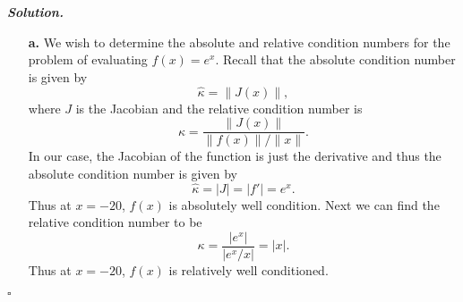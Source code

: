 \documentclass[12pt]{report}
\newenvironment{solution}[1][\it{Solution}]{\textbf{#1. } }{$\square$}
\begin{document}
\begin{solution}
    \noindent
    \begin{enumerate}
        \item [{\bf a.}]
        We wish to determine the absolute and relative condition numbers for the problem of evaluating $f(x) = e^x$. Recall that the absolute condition number is given by
        \[
            \hat{\kappa} = \|J(x)\|,
        \] 
        where $J$ is the Jacobian and the relative condition number is
        \[
            \kappa = \frac{\|J(x)\|}{\|f(x)\|/\|x\|}.
        \] 
        In our case, the Jacobian of the function is just the derivative and thus the absolute condition number is given by
        \[ \hat{\kappa} = |J| = |f'| = e^x.\]
        Thus at $x=-20$, $f(x)$ is absolutely well condition. Next we can find the relative condition number to be 
        \[ 
            \kappa = \frac{|e^x|}{|e^x/x|} = |x|.
        \]
        Thus at $x = -20$, $f(x)$ is relatively well conditioned. 


\end{enumerate}
\end{solution}
\end{document}
